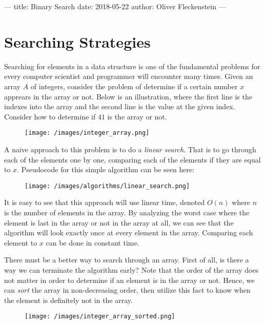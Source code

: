 ---
title: Binary Search
date: 2018-05-22
author: Oliver Fleckenstein
---
\chapter{Searching Strategies}

    Searching for elements in a data structure is one of the fundamental problems for every computer scientist and programmer will encounter many times.
    Given an array $A$ of integers, consider the problem of determine if a certain number $x$ apprears in the array or not.
    Below is an illustration, where the first line is the indexes into the array and the second line is the value at the given index.
    Consider how to determine if $41$ is the array or not.

    \begin{figure}[!h]
        \centering
        \texttt{[image: /images/integer\_array.png]}
    \end{figure}

    A naive approach to this problem is to do a \emph{linear search}.
    That is to go through each of the elements one by one, comparing each of the elements if they are equal to $x$.
    Pseudocode for this simple algorithm can be seen here:

    \begin{figure}[!h]
        \centering
        \texttt{[image: /images/algorithms/linear\_search.png]}
    \end{figure}

    It is easy to see that this approach will use linear time, denoted $O(n)$ where $n$ is the number of elements in the array.
    By analyzing the worst case where the element is last in the array or not in the array at all, we can see that the algorithm will look exactly once at every element in the array.
    Comparing each element to $x$ can be done in constant time.

    There must be a better way to search through an array.
    First of all, is there a way we can terminate the algorithm early?
    Note that the order of the array does not matter in order to determine if an element is in the array or not.
    Hence, we can \emph{sort} the array in non-decreasing order, then utilize this fact to know when the element is definitely not in the array.

    \begin{figure}[!h]
        \centering
        \texttt{[image: /images/integer\_array\_sorted.png]}
    \end{figure}

